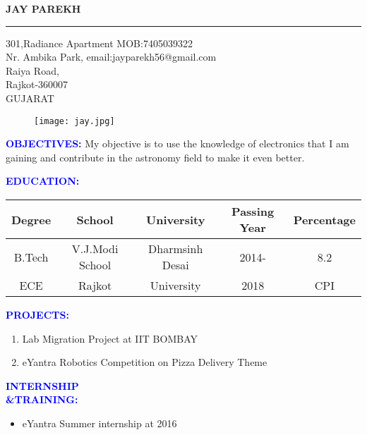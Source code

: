 \documentclass{article}
\begin{document}
	\begin{center}
		\huge \textbf{JAY PAREKH}
	\end{center}
	 \hrule 
\vspace{0.1in} 
\begin{flushleft}
\large 301,Radiance Apartment \hspace{0.6in} MOB:7405039322 \\
Nr. Ambika Park, \hspace{1.1in} email:jayparekh56@gmail.com\\
Raiya Road, \\
Rajkot-360007 \\
GUJARAT
\end{flushleft}

\begin{figure}[h]
	\centering
	\hspace{2in}
	\texttt{[image: jay.jpg]}
	\label{fig_1}
\end{figure}
\begin{flushleft}
	\textcolor{blue}{\textbf{OBJECTIVES:}} My objective is to use the knowledge of electronics that I am gaining and contribute in the astronomy field to make it even better.    
\end{flushleft}
\begin{flushleft}
	\textcolor{blue}{\textbf{EDUCATION:}}			
	\begin{tabular}{|c|c|c|c|c|}
		\hline
		Degree&School&University&Passing Year&Percentage \\
		\hline
		B.Tech&V.J.Modi School&Dharmsinh Desai&2014-&8.2\\
		ECE&Rajkot&University&2018&CPI\\
		\hline
	\end{tabular}		 
\end{flushleft}
\begin{flushleft}
	\textcolor{blue}{\textbf{PROJECTS:}}
	\begin{enumerate}
		\vspace{-0.29in}
		\addtolength{\itemindent}{1.0in}
		\item Lab Migration Project at IIT BOMBAY
		\item eYantra Robotics Competition on Pizza Delivery Theme
	\end{enumerate}	
\end{flushleft}

\begin{flushleft}
	\textcolor{blue}{\textbf{INTERNSHIP\\\&TRAINING:}}
	\begin{itemize}
		\vspace{-0.29in}
		\addtolength{\itemindent}{1.0in}	
		\item eYantra Summer internship at 2016
	\end{itemize}
\end{flushleft}
\end{document}
